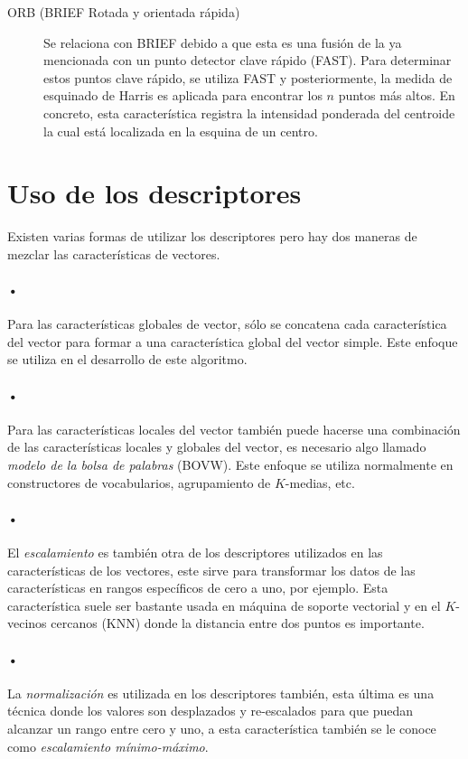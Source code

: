 \begin{description}
\item[ORB (BRIEF Rotada y orientada rápida)]{Se relaciona con BRIEF debido a
que esta es una fusión de la ya mencionada con un punto detector clave rápido (FAST). Para determinar estos puntos clave rápido, se utiliza FAST y posteriormente, la medida de esquinado de Harris es aplicada para encontrar los $n$ puntos más altos. En concreto, esta característica registra la intensidad ponderada del centroide la cual está localizada en la esquina de un centro.}
\end{description}

\section{Uso de los descriptores}
Existen varias formas de utilizar los descriptores pero hay dos maneras de mezclar las características de vectores.

\paragraph{•} Para las características globales de vector, sólo se concatena cada característica del vector para formar a una característica global del vector simple. Este enfoque se utiliza en el desarrollo de este algoritmo.

\paragraph{•} Para las características locales del vector también puede hacerse una combinación de las características locales y globales del vector, es necesario algo llamado \emph{modelo de la bolsa de palabras} (BOVW). Este enfoque se utiliza normalmente en constructores de vocabularios, agrupamiento de $K$-medias, etc.

\paragraph{•} El \emph{escalamiento} es también otra de los descriptores utilizados en las características de los vectores, este sirve para transformar los datos de las características en rangos específicos de cero a uno, por ejemplo. Esta característica suele ser bastante usada en máquina de soporte vectorial y en el $K$-vecinos cercanos (KNN) donde la distancia entre dos puntos es importante.

\paragraph{•} La \emph{normalización} es utilizada en los descriptores también, esta última es una técnica donde los valores son desplazados y re-escalados  para que puedan alcanzar un rango entre cero y uno, a esta característica también se le conoce como \emph{escalamiento mínimo-máximo}.

